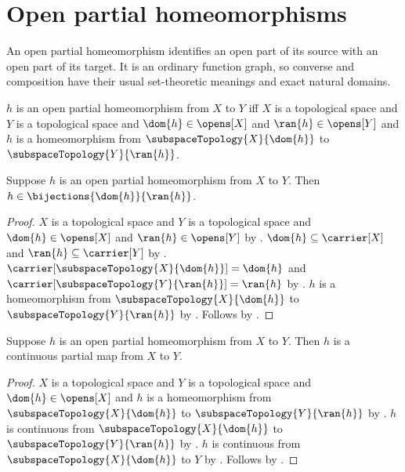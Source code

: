 \section{Open partial homeomorphisms}




An open partial homeomorphism identifies an open part of its source with an
open part of its target. It is an ordinary function graph, so converse and
composition have their usual set-theoretic meanings and exact natural domains.

\begin{definition}\label{open_partial_homeomorphism}
    $h$ is an open partial homeomorphism from $X$ to $Y$ iff
        $X$ is a topological space and $Y$ is a topological space and
        $\dom{h}\in\opens[X]$ and $\ran{h}\in\opens[Y]$ and
        $h$ is a homeomorphism from $\subspaceTopology{X}{\dom{h}}$
            to $\subspaceTopology{Y}{\ran{h}}$.
\end{definition}

\begin{proposition}\label{open_partial_homeomorphism_bijection}
    Suppose $h$ is an open partial homeomorphism from $X$ to $Y$.
    Then $h\in\bijections{\dom{h}}{\ran{h}}$.
\end{proposition}
\begin{proof}
    $X$ is a topological space and $Y$ is a topological space and
        $\dom{h}\in\opens[X]$ and $\ran{h}\in\opens[Y]$ by
        .
    $\dom{h}\subseteq\carrier[X]$ and $\ran{h}\subseteq\carrier[Y]$ by
        .
    $\carrier[\subspaceTopology{X}{\dom{h}}]=\dom{h}$ and
        $\carrier[\subspaceTopology{Y}{\ran{h}}]=\ran{h}$ by
        .
    $h$ is a homeomorphism from $\subspaceTopology{X}{\dom{h}}$
        to $\subspaceTopology{Y}{\ran{h}}$ by
        .
    Follows by .
\end{proof}

\begin{theorem}\label{open_partial_homeomorphism_is_continuous_partial_map}
    Suppose $h$ is an open partial homeomorphism from $X$ to $Y$.
    Then $h$ is a continuous partial map from $X$ to $Y$.
\end{theorem}
\begin{proof}
    $X$ is a topological space and $Y$ is a topological space and
        $\dom{h}\in\opens[X]$ and
        $h$ is a homeomorphism from $\subspaceTopology{X}{\dom{h}}$ to
            $\subspaceTopology{Y}{\ran{h}}$ by .
    $h$ is continuous from $\subspaceTopology{X}{\dom{h}}$ to
        $\subspaceTopology{Y}{\ran{h}}$ by .
    $h$ is continuous from $\subspaceTopology{X}{\dom{h}}$ to $Y$ by
        .
    Follows by .
\end{proof}

